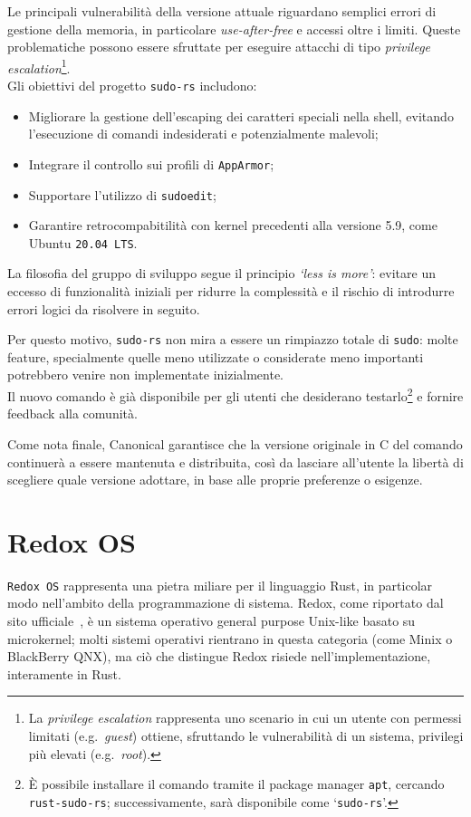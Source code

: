 Le principali vulnerabilità della versione attuale riguardano semplici errori di gestione della memoria, in particolare 
\textit{use-after-free} e accessi oltre i limiti.
Queste problematiche possono essere sfruttate per eseguire attacchi di tipo \textit{privilege escalation}\footnote{La \textit{privilege escalation} rappresenta uno scenario in cui 
un utente con permessi limitati (e.g.\ \textit{guest}) ottiene, sfruttando le vulnerabilità di un sistema, privilegi più elevati (e.g.\ \textit{root}).}. \hfill
\vspace{10pt} \\
\noindent Gli obiettivi del progetto \texttt{sudo-rs} includono:
\begin{itemize}
    \item Migliorare la gestione dell'escaping dei caratteri speciali nella shell, evitando l'esecuzione di comandi indesiderati e potenzialmente malevoli;
    \item Integrare il controllo sui profili di \texttt{AppArmor};
    \item Supportare l'utilizzo di \texttt{sudoedit};
    \item Garantire retrocompabitilità con kernel precedenti alla versione 5.9, come Ubuntu \texttt{20.04 LTS}.\ 
\end{itemize}
La filosofia del gruppo di sviluppo segue il principio \textit{`less is more'}: evitare un eccesso di funzionalità iniziali per ridurre la complessità e il rischio di
introdurre errori logici da risolvere in seguito.

Per questo motivo, \texttt{sudo-rs} non mira a essere un rimpiazzo totale di \texttt{sudo}: molte feature, specialmente quelle meno utilizzate o considerate meno importanti potrebbero venire non implementate inizialmente. \hfill
\vspace{7pt} \\
\noindent Il nuovo comando è già disponibile per gli utenti che desiderano testarlo\footnote{È possibile installare il comando tramite il package manager \texttt{apt}, cercando \texttt{rust-sudo-rs}; successivamente, sarà disponibile come `\texttt{sudo-rs}'.} e fornire feedback alla comunità.

Come nota finale, Canonical garantisce che la versione originale in C del comando continuerà a essere mantenuta e distribuita,
così da lasciare all'utente la libertà di scegliere quale versione adottare, in base alle proprie preferenze o esigenze.

\section{Redox OS}
\texttt{Redox OS} rappresenta una pietra miliare per il linguaggio Rust, in particolar modo nell'ambito della programmazione di sistema.
Redox, come riportato dal sito ufficiale~\cite{redox-os}, è un sistema operativo general purpose Unix-like basato su microkernel; molti sistemi operativi rientrano in questa categoria (come Minix o BlackBerry QNX),
ma ciò che distingue Redox risiede nell'implementazione, interamente in Rust. 

